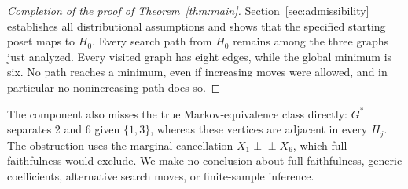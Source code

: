 \documentclass[11pt]{article}
\newcommand{\indep}{\mathrel{\perp\!\!\!\perp}}
\begin{document}
\begin{proof}[Completion of the proof of Theorem~\ref{thm:main}]
Section~\ref{sec:admissibility} establishes all distributional assumptions
and shows that the specified starting poset maps to $H_0$.
Every search path from $H_0$ remains among the three graphs just analyzed.
Every visited graph has eight edges, while the global minimum is six.
No path reaches a minimum, even if increasing moves were allowed, and
in particular no nonincreasing path does so.\qedhere
\end{proof}

The component also misses the true Markov-equivalence class directly:
$G^*$ separates 2 and 6 given $\{1,3\}$, whereas these vertices are adjacent
in every $H_j$. The obstruction uses the marginal cancellation
$X_1\indep X_6$, which full faithfulness would exclude. We make no
conclusion about full faithfulness, generic coefficients, alternative
search moves, or finite-sample inference.

\appendix
\end{document}
